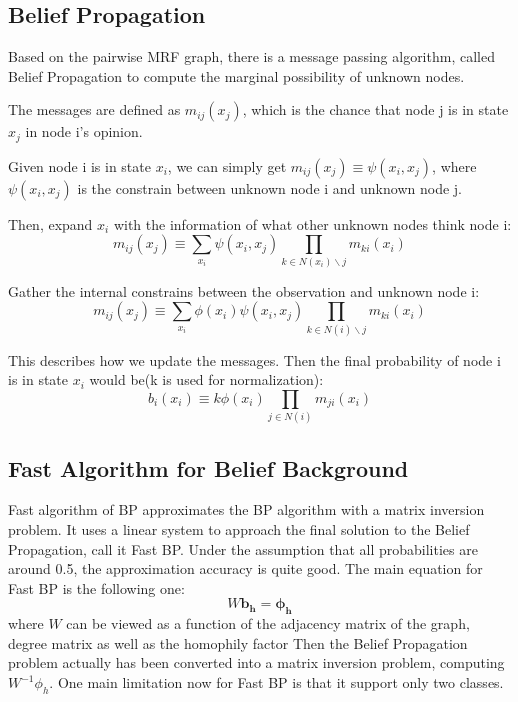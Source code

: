 

\subsection{Belief Propagation}
Based on the pairwise MRF graph, there is a message passing algorithm, called Belief Propagation\cite{Yedidia:2003:UBP} to compute the marginal possibility of unknown nodes.

The messages are defined as $m_{ij}(x_j)$, which is the chance that node j is in state $x_j$ in node i's opinion.

Given node i is in state $x_i$, we can simply get $m_{ij}(x_j) \equiv \psi(x_i, x_j)$, where $\psi(x_i, x_j)$
is the constrain between unknown node i and unknown node j.

Then, expand $x_{i}$ with the information of what other unknown nodes think node i:
$$m_{ij}(x_j) \equiv \sum_{x_i} {\psi(x_i, x_j) \prod_{k \in N(x_i) \backslash j}{m_{ki}(x_i)}}$$

Gather the internal constrains between the observation and unknown node i:
$$m_{ij}(x_j) \equiv \sum_{x_i} {\phi(x_i) \psi(x_i, x_j) \prod_{k \in N(i) \backslash j}{m_{ki}(x_i)}}$$

This describes how we update the messages. Then the final probability of node i is in state $x_i$ would be(k is used for normalization):
$$b_i(x_i) \equiv k\phi(x_i)\prod_{j \in N(i)} m_{ji}(x_i)$$

\subsection{Fast Algorithm for Belief Background}
Fast algorithm of BP approximates the BP algorithm with a matrix inversion problem\cite{KoutraKKCPF11}. It uses a linear system to approach the final solution to the Belief Propagation, call it Fast BP.
Under the assumption that all probabilities are around 0.5, the approximation accuracy is quite good.
The main equation for Fast BP is the following one:
$$W\mathbf{b_h}=\mathbf{\phi_h}$$
where $W$ can be viewed as a function of the adjacency matrix of the graph, degree matrix as well as the homophily factor Then the Belief Propagation problem actually has been converted into a matrix inversion problem, computing $W^{-1}{\phi_h}$. One main limitation now for Fast BP is that it support only two classes.
